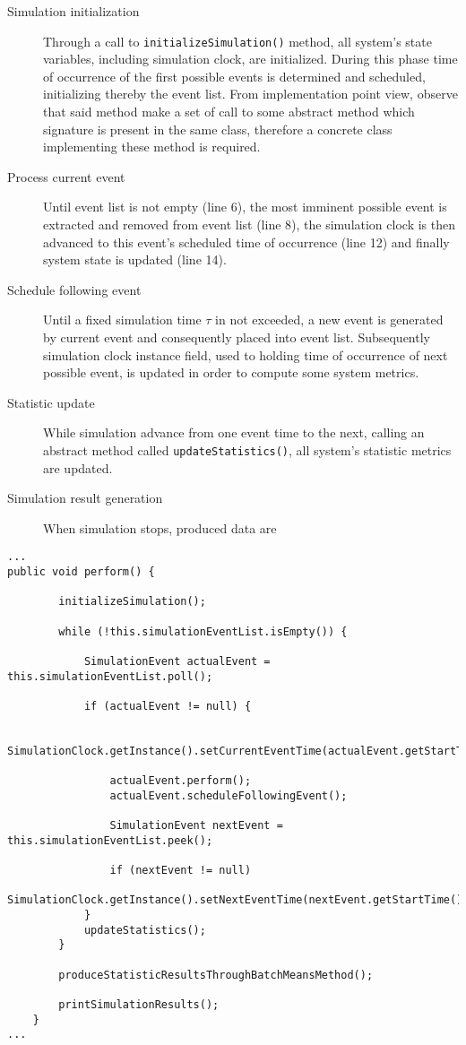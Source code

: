 \documentclass[10pt,a4paper]{article}
\begin{document}
\begin{description}
\item[Simulation initialization] Through a call to \texttt{initializeSimulation()} method, all system's state variables, including simulation clock, are initialized. During this phase time of occurrence of the first possible events is determined and scheduled, initializing thereby the event list.
From implementation point view, observe that said method make a set of call to some abstract method which signature is present in the same class, therefore a concrete class implementing these method is required.

\item[Process current event] Until event list is not empty (line 6), the most imminent possible event is extracted and removed from event list (line 8), the simulation clock is then advanced to this event's scheduled time of occurrence (line 12) and finally system state is updated (line 14). 

\item[Schedule following event] Until a fixed simulation time $\tau$ in not exceeded, a new event is generated by current event and consequently placed into event list. Subsequently simulation clock instance field, used to holding time of occurrence of next possible event, is updated in order to compute some system metrics.

\item[Statistic update] While simulation advance from one event time to the next, calling an abstract method called \texttt{updateStatistics()}, all system's statistic metrics are updated.

\item[Simulation result generation] When simulation stops, produced data are 

\end{description}


\begin{lstlisting}[frame=lines, caption={Snippet of \texttt{perform} method}, label={code:perform}]
...
public void perform() {

        initializeSimulation();

        while (!this.simulationEventList.isEmpty()) {

            SimulationEvent actualEvent = this.simulationEventList.poll();

            if (actualEvent != null) {

                SimulationClock.getInstance().setCurrentEventTime(actualEvent.getStartTime());

                actualEvent.perform();
                actualEvent.scheduleFollowingEvent();

                SimulationEvent nextEvent = this.simulationEventList.peek();

                if (nextEvent != null)
                    SimulationClock.getInstance().setNextEventTime(nextEvent.getStartTime());
            }
            updateStatistics();
        }

        produceStatisticResultsThroughBatchMeansMethod();

        printSimulationResults();
    }
...
\end{lstlisting}
\end{document}
